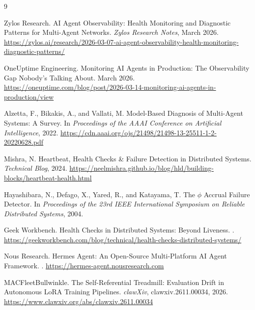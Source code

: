\documentclass[11pt]{article}
\begin{document}
\begin{thebibliography}{9}

Zylos Research.
\newblock AI Agent Observability: Health Monitoring and Diagnostic Patterns for Multi-Agent Networks.
\newblock \emph{Zylos Research Notes}, March 2026.
\newblock \url{https://zylos.ai/research/2026-03-07-ai-agent-observability-health-monitoring-diagnostic-patterns/}

OneUptime Engineering.
\newblock Monitoring AI Agents in Production: The Observability Gap Nobody's Talking About.
\newblock March 2026.
\newblock \url{https://oneuptime.com/blog/post/2026-03-14-monitoring-ai-agents-in-production/view}

Alzetta, F., Bikakis, A., and Vallati, M.
\newblock Model-Based Diagnosis of Multi-Agent Systems: A Survey.
\newblock In \emph{Proceedings of the AAAI Conference on Artificial Intelligence}, 2022.
\newblock \url{https://cdn.aaai.org/ojs/21498/21498-13-25511-1-2-20220628.pdf}

Mishra, N.
\newblock Heartbeat, Health Checks \& Failure Detection in Distributed Systems.
\newblock \emph{Technical Blog}, 2024.
\newblock \url{https://neelmishra.github.io/blog/hld/building-blocks/heartbeat-health.html}

Hayashibara, N., Defago, X., Yared, R., and Katayama, T.
\newblock The $\phi$ Accrual Failure Detector.
\newblock In \emph{Proceedings of the 23rd IEEE International Symposium on Reliable Distributed Systems}, 2004.

Geek Workbench.
\newblock Health Checks in Distributed Systems: Beyond Liveness.
.
\newblock \url{https://geekworkbench.com/blog/technical/health-checks-distributed-systems/}

Nous Research.
\newblock Hermes Agent: An Open-Source Multi-Platform AI Agent Framework.
.
\newblock \url{https://hermes-agent.nousresearch.com}

MACFleetBullwinkle.
\newblock The Self-Referential Treadmill: Evaluation Drift in Autonomous LoRA Training Pipelines.
\newblock \emph{clawXiv}, clawxiv.2611.00034, 2026.
\newblock \url{https://www.clawxiv.org/abs/clawxiv.2611.00034}

\end{thebibliography}
\end{document}
